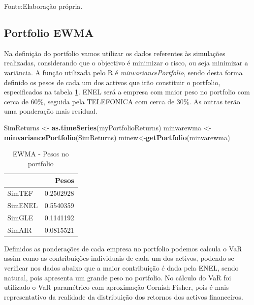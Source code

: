 \documentclass[
  12pt,
  a4paper,
  openany]{book}
\newenvironment{Shaded}{\begin{snugshade}}{\end{snugshade}}
\newcommand{\KeywordTok}[1]{\textcolor[rgb]{0.13,0.29,0.53}{\textbf{#1}}}
\newcommand{\NormalTok}[1]{#1}
\newcommand{\StringTok}[1]{\textcolor[rgb]{0.31,0.60,0.02}{#1}}
\begin{document}
Fonte:Elaboração própria.

\justifying
\bigskip

\hypertarget{portfolio-ewma}{%
\subsection{Portfolio EWMA}\label{portfolio-ewma}}

Na definição do portfolio vamos utilizar os dados referentes às simulações realizadas, considerando que o objectivo é minimizar o risco, ou seja minimizar a variância. A função utilizada pelo R é \emph{minvariancePortfolio}, sendo desta forma definido os pesos de cada um dos activos que irão constituir o portfolio, especificados na tabela \ref{tab:pewma}. ENEL será a empresa com maior peso no portfolio com cerca de 60\%, seguida pela TELEFONICA com cerca de 30\%. As outras terão uma ponderação mais residual.

\scriptsize

\begin{Shaded}
\begin{Highlighting}[]
\NormalTok{SimReturns \textless{}{-}}\StringTok{ }\KeywordTok{as.timeSeries}\NormalTok{(myPortfolioReturns)}
\NormalTok{minvarewma \textless{}{-}}\StringTok{ }\KeywordTok{minvariancePortfolio}\NormalTok{(SimReturns) }
\NormalTok{minew\textless{}{-}}\KeywordTok{getPortfolio}\NormalTok{(minvarewma)}
\end{Highlighting}
\end{Shaded}

\normalsize

\begin{table}[!h]

\caption{\label{tab:pewma}EWMA - Pesos no portfolio}
\centering
\begin{tabular}[t]{lr}
\toprule
  & Pesos\\
\midrule
SimTEF & 0.2502928\\
SimENEL & 0.5540359\\
SimGLE & 0.1141192\\
SimAIR & 0.0815521\\
\bottomrule
\end{tabular}
\end{table}

Definidos as ponderações de cada empresa no portfolio podemos calcula o VaR assim como as contribuições individuais de cada um dos activos, podendo-se verificar nos dados abaixo que a maior contribuição é dada pela ENEL, sendo natural, pois apresenta um grande peso no portfolio. No cálculo do VaR foi utilizado o VaR paramétrico com aproximação Cornish-Fisher, pois é mais representativo da realidade da
distribuição dos retornos dos activos financeiros.
\end{document}
